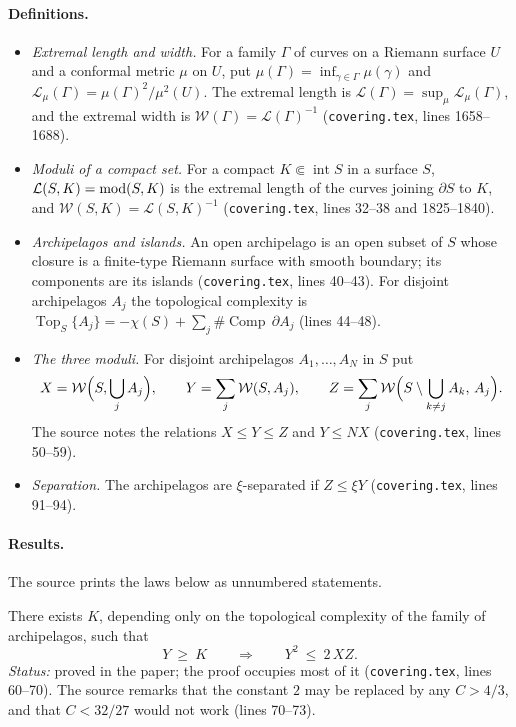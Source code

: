 \paragraph{Definitions.}
\begin{itemize}
\item \emph{Extremal length and width.}  For a family $\Gamma$ of curves on a Riemann surface $U$ and
a conformal metric $\mu$ on $U$, put $\mu(\Gamma)=\inf_{\gamma\in\Gamma}\mu(\gamma)$ and
$\mathcal L_\mu(\Gamma)=\mu(\Gamma)^2/\mu^2(U)$.  The extremal length is
$\mathcal L(\Gamma)=\sup_\mu\mathcal L_\mu(\Gamma)$, and the extremal width is
$\mathcal W(\Gamma)=\mathcal L(\Gamma)^{-1}$ (\texttt{covering.tex}, lines 1658--1688).
\item \emph{Moduli of a compact set.}  For a compact $K\Subset\operatorname{int}S$ in a surface $S$,
$\mathcal L(S,K)=\operatorname{mod}(S,K)$ is the extremal length of the curves joining $\partial S$ to $K$, and
$\mathcal W(S,K)=\mathcal L(S,K)^{-1}$ (\texttt{covering.tex}, lines 32--38 and 1825--1840).
\item \emph{Archipelagos and islands.}  An open archipelago is an open subset of $S$ whose closure is a
finite-type Riemann surface with smooth boundary; its components are its islands (\texttt{covering.tex},
lines 40--43).  For disjoint archipelagos $A_j$ the topological complexity is
$\operatorname{Top}_S\{A_j\}=-\chi(S)+\sum_j\#\operatorname{Comp}\,\partial A_j$ (lines 44--48).
\item \emph{The three moduli.}  For disjoint archipelagos $A_1,\dots,A_N$ in $S$ put
\[
X=\mathcal W\Bigl(S,\bigcup_jA_j\Bigr),\qquad
Y=\sum_j\mathcal W(S,A_j),\qquad
Z=\sum_j\mathcal W\Bigl(S\setminus\bigcup_{k\neq j}A_k,\,A_j\Bigr).
\]
The source notes the relations $X\le Y\le Z$ and $Y\le NX$ (\texttt{covering.tex}, lines 50--59).
\item \emph{Separation.}  The archipelagos are $\xi$-separated if $Z\le\xi Y$ (\texttt{covering.tex},
lines 91--94).
\end{itemize}

\paragraph{Results.}  The source prints the laws below as unnumbered statements.

\begin{theorem}
\label{thm:kl-qa-law}
There exists $K$, depending only on the topological complexity of the family of archipelagos, such that
\[
Y\ \ge\ K\qquad\Longrightarrow\qquad Y^2\ \le\ 2\,XZ.
\]
\emph{Status:} proved in the paper; the proof occupies most of it (\texttt{covering.tex}, lines 60--70).
The source remarks that the constant $2$ may be replaced by any $C>4/3$, and that $C<32/27$ would not work
(lines 70--73).
\end{theorem}

